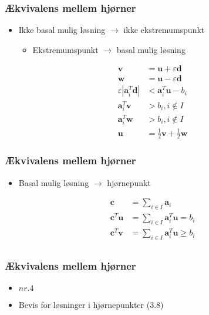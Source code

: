 \begin{frame}
\frametitle{Ækvivalens mellem hjørner}
\begin{itemize}
\item Ikke basal mulig løsning $\rightarrow$ ikke ekstremumspunkt
%
\begin{itemize}
\item Ekstremumspunkt $\rightarrow$ basal mulig løsning
\end{itemize}
\end{itemize}
%
\begin{align*}
\textbf{v} &= \textbf{u} + \varepsilon\textbf{d}\\
\textbf{w} &= \textbf{u} - \varepsilon\textbf{d}\\
\varepsilon|\textbf{a}_i^T\textbf{d}| &< \textbf{a}_i^T\textbf{u}-b_i\\
\textbf{a}_i^T\textbf{v} &> b_i, i\notin I\\
\textbf{a}_i^T\textbf{w} &> b_i, i\notin I\\
\textbf{u} &= \frac{1}{2}\textbf{v} + \frac{1}{2}\textbf{w}
\end{align*}
%
\end{frame}
%
%
\begin{frame}
\frametitle{Ækvivalens mellem hjørner}
\begin{itemize}
\item Basal mulig løsning $\rightarrow$ hjørnepunkt
\end{itemize}
%
\begin{align*}
\textbf{c} &= \sum_{i\in I} \textbf{a}_i\\
\textbf{c}^T\textbf{u} &= \sum_{i\in I} \textbf{a}_i^T\textbf{u} = 
 b_i\\
\textbf{c}^T\textbf{v} &= \sum_{i\in I} \textbf{a}_i^T\textbf{u} \geq 
 b_i\\
\end{align*}
\end{frame}
%
%
%
\begin{frame}
\frametitle{Ækvivalens mellem hjørner}
\begin{itemize}
\item \textbf{$nr. 4$}
\item Bevis for løsninger i hjørnepunkter (3.8)
\end{itemize}
\end{frame}